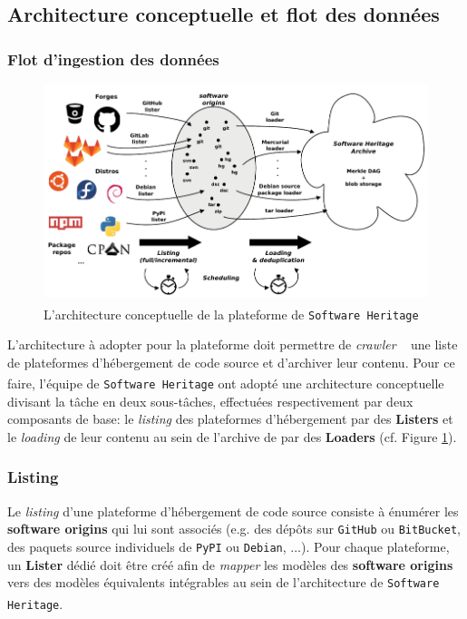 \documentclass[12pt,a4paper]{report}
\theoremstyle{definition}
\begin{document}
\subsection{Architecture conceptuelle et flot des données}
\subsubsection{Flot d'ingestion des données}
\begin{figure}[!ht]
	\centering
	\includegraphics[scale=0.5]{images/swh/conceptual_architecture.png}
	\caption{L'architecture conceptuelle de la plateforme de \texttt{Software Heritage}\textsuperscript{\citep{dicosmoWhyAndHow}}}
	\label{fig:swh_conceptual_architecture}
\end{figure}

L'architecture à adopter pour la plateforme doit permettre de \og \textit{crawler} \fg~ une liste de plateformes d'hébergement de code source et d'archiver leur contenu. Pour ce faire, l'équipe de \texttt{Software Heritage} ont adopté une architecture conceptuelle\textsuperscript{\citep{dicosmoWhyAndHow}} divisant la tâche en deux sous-tâches, effectuées respectivement par deux composants de base: le \textit{listing} des plateformes d'hébergement par des \textbf{Listers} et le \textit{loading} de leur contenu au sein de l'archive de par des \textbf{Loaders} (cf. Figure \ref{fig:swh_conceptual_architecture}).

\subsubsection{Listing}
Le \textit{listing} d'une plateforme d'hébergement de code source consiste à énumérer les \textbf{software origins} qui lui sont associés (e.g. des dépôts sur \texttt{GitHub} ou \texttt{BitBucket}, des paquets source individuels de \texttt{PyPI} ou \texttt{Debian}, $\dots$). Pour chaque plateforme, un \textbf{Lister} dédié doit être créé afin de \og \textit{mapper} \fg les modèles des \textbf{software origins} vers des modèles équivalents intégrables au sein de l'architecture de \texttt{Software Heritage}\textsuperscript{\citep{dicosmoWhyAndHow}}.
\end{document}
